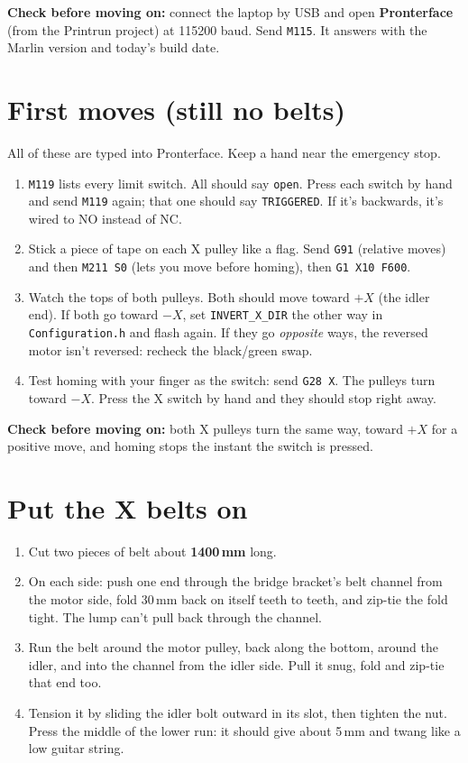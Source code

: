 \documentclass[10pt]{article}
\newcommand{\mm}{\,mm}
\newcommand{\file}[1]{\texttt{#1}}
\newcommand{\gcode}[1]{\texttt{#1}}
\newcommand{\gate}[1]{\par\smallskip\noindent\colorbox{okgreen!10}{\parbox{\dimexpr\linewidth-2\fboxsep}{\textcolor{okgreen}{\textbf{Check before moving on:}} #1}}\par\smallskip}
\begin{document}
\gate{connect the laptop by USB and open \textbf{Pronterface} (from the Printrun project) at
115200 baud. Send \gcode{M115}. It answers with the Marlin version and today's build date.}

\section{First moves (still no belts)}

All of these are typed into Pronterface. Keep a hand near the emergency stop.

\begin{enumerate}
  \item \gcode{M119} lists every limit switch. All should say \texttt{open}. Press each switch by
        hand and send \gcode{M119} again; that one should say \texttt{TRIGGERED}. If it's backwards,
        it's wired to NO instead of NC.
  \item Stick a piece of tape on each X pulley like a flag. Send \gcode{G91} (relative moves) and then
        \gcode{M211 S0} (lets you move before homing), then \gcode{G1 X10 F600}.
  \item Watch the tops of both pulleys. Both should move toward $+X$ (the idler end). If both go
        toward $-X$, set \texttt{INVERT\_X\_DIR} the other way in \file{Configuration.h} and flash
        again. If they go \emph{opposite} ways, the reversed motor isn't reversed: recheck the
        black/green swap.
  \item Test homing with your finger as the switch: send \gcode{G28 X}. The pulleys turn toward
        $-X$. Press the X switch by hand and they should stop right away.
\end{enumerate}

\gate{both X pulleys turn the same way, toward $+X$ for a positive move, and homing stops the
instant the switch is pressed.}

\section{Put the X belts on}

\begin{enumerate}
  \item Cut two pieces of belt about \textbf{1400\mm} long.
  \item On each side: push one end through the bridge bracket's belt channel from the motor side,
        fold 30\mm{} back on itself teeth to teeth, and zip-tie the fold tight. The lump can't pull
        back through the channel.
  \item Run the belt around the motor pulley, back along the bottom, around the idler, and into the
        channel from the idler side. Pull it snug, fold and zip-tie that end too.
  \item Tension it by sliding the idler bolt outward in its slot, then tighten the nut. Press the
        middle of the lower run: it should give about 5\mm{} and twang like a low guitar string.
\end{enumerate}
\end{document}
